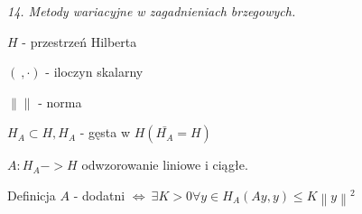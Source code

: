 \textit{14. Metody wariacyjne w zagadnieniach brzegowych.}

$H$ - przestrzeń Hilberta

$(\ ,\cdot)$ - iloczyn skalarny

$\left \|  \right \|$ - norma

$H_A \subset H, H_A$ - gęsta w $H (\bar{H_A} = H)$

$A: H_A -> H$ odwzorowanie liniowe i ciągłe.

Definicja
$A$ - dodatni $\Leftrightarrow\ \exists K > 0 \forall y \in H_A (Ay,y) \leqslant K \left \| y \right \| ^ 2$
